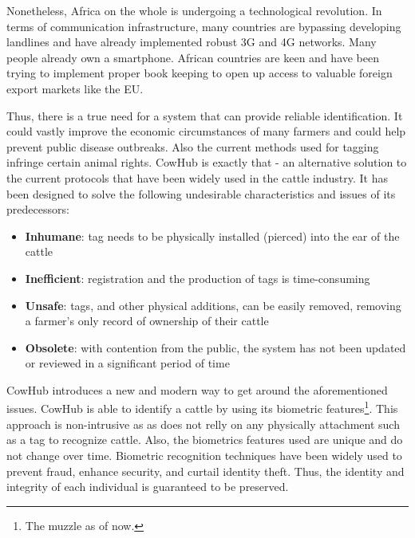 Nonetheless, Africa on the whole is undergoing a technological revolution. In terms of communication infrastructure, many countries are bypassing developing landlines and have already implemented robust 3G and 4G networks. Many people already own a smartphone. African countries are keen and have been trying to implement proper book keeping to open up access to valuable foreign export markets like the EU.

Thus, there is a true need for a system that can provide reliable identification. It could vastly improve the economic circumstances of many farmers and could help prevent public disease outbreaks. Also the current methods used for tagging infringe certain animal rights.  CowHub is exactly that - an alternative solution to the current protocols that have been widely used in the cattle industry. It has been designed to solve the following undesirable characteristics and issues of its predecessors:

\begin{itemize}
	\item \textbf{Inhumane}: tag needs to be physically installed (pierced) into the ear of the cattle
	\item \textbf{Inefficient}: registration and the production of tags is time-consuming
	\item \textbf{Unsafe}: tags, and other physical additions, can be easily removed, removing a farmer's only record of ownership of their cattle
	\item \textbf{Obsolete}: with contention from the public, the system has not been updated or reviewed in a significant period of time
\end{itemize}

CowHub introduces a new and modern way to get around the aforementioned issues. CowHub is able to identify a cattle by using its biometric features\footnote{The muzzle as of now.}. This approach is non-intrusive as as does not relly on any physically attachment such as a tag to recognize cattle. Also, the biometrics features used are unique and do not change over time. Biometric recognition techniques have been widely used to prevent fraud, enhance security, and curtail identity theft\cite{biometrics}. Thus, the identity and integrity of each individual is guaranteed to be preserved.
